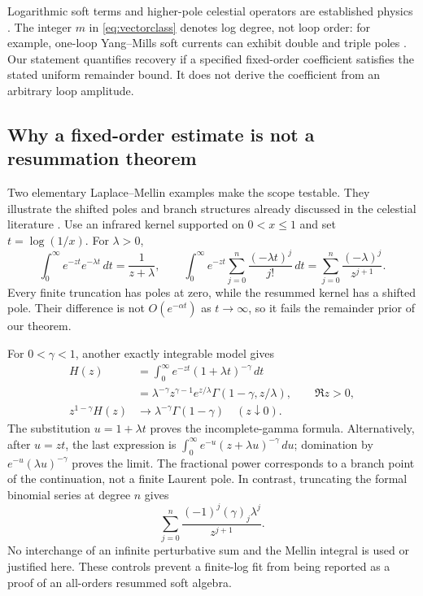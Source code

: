 Logarithmic soft terms and higher-pole celestial operators are established
physics \cite{sahoosen,loopcurrents,longrange}. The integer $m$ in
\eqref{eq:vectorclass} denotes log degree, not loop order: for example,
one-loop Yang--Mills soft currents can exhibit double and triple poles
\cite{loopcurrents}. Our statement quantifies recovery if a specified
fixed-order coefficient satisfies the stated uniform remainder bound.
It does not derive the coefficient from an arbitrary loop amplitude.

\subsection{Why a fixed-order estimate is not a resummation theorem}
\label{sec:resummation}
Two elementary Laplace--Mellin examples make the scope testable.
They illustrate the shifted poles and branch structures already
discussed in the celestial literature \cite{gu}.
Use an infrared kernel supported on $0<x\le1$ and set $t=\log(1/x)$.
For $\lambda>0$,
\begin{equation}\label{eq:shiftedpole}
 \int_0^\infty e^{-zt}e^{-\lambda t}\,dt=\frac1{z+\lambda},
 \qquad
 \int_0^\infty e^{-zt}\sum_{j=0}^n
 \frac{(-\lambda t)^j}{j!}\,dt
 =\sum_{j=0}^n\frac{(-\lambda)^j}{z^{j+1}}.
\end{equation}
Every finite truncation has poles at zero, while the resummed kernel
has a shifted pole. Their difference is not $O(e^{-\alpha t})$
as $t\to\infty$, so it fails the remainder prior of our theorem.

For $0<\gamma<1$, another exactly integrable model gives
\begin{align}
 H(z)&=\int_0^\infty e^{-zt}(1+\lambda t)^{-\gamma}\,dt
 \label{eq:branchmodel}\\
 &=\lambda^{-\gamma}z^{\gamma-1}e^{z/\lambda}
 \Gamma(1-\gamma,z/\lambda),\qquad \Re z>0,\nonumber\\
 z^{1-\gamma}H(z)&\longrightarrow
 \lambda^{-\gamma}\Gamma(1-\gamma)\quad(z\downarrow0).
 \label{eq:branchlimit}
\end{align}
The substitution $u=1+\lambda t$ proves the incomplete-gamma formula.
Alternatively, after $u=zt$, the last expression is
$\int_0^\infty e^{-u}(z+\lambda u)^{-\gamma}\,du$;
domination by $e^{-u}(\lambda u)^{-\gamma}$ proves the limit.
The fractional power corresponds to a branch point of the continuation,
not a finite Laurent pole. In contrast, truncating the formal binomial
series at degree $n$ gives
\[
 \sum_{j=0}^n\frac{(-1)^j(\gamma)_j\lambda^j}{z^{j+1}}.
\]
No interchange of an infinite perturbative sum and the Mellin integral
is used or justified here. These controls prevent a finite-log fit
from being reported as a proof of an all-orders resummed soft algebra.
